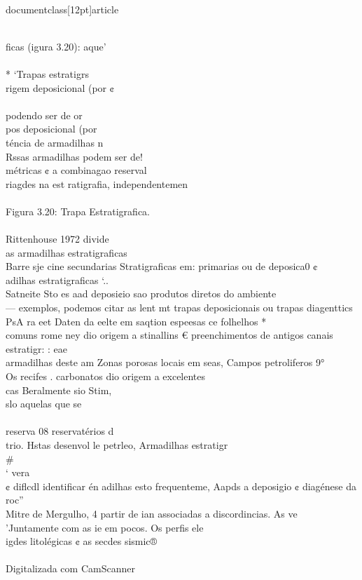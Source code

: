 \\documentclass[12pt]{article}
\begin{document}
\\{ficas (igura 3.20): aque’\\
\\
* ‘Trapas estratigrs\\
rigem deposicional (por ¢\\
\\
podendo ser de or\\
pos deposicional (por\\
téncia de armadilhas n\\
Rssas armadilhas podem ser de!\\
métricas ¢ a combinagao reserval\\
riagdes na est ratigrafia, independentemen\\
\\
Figura 3.20: Trapa Estratigrafica.\\
\\
Rittenhouse 1972 divide\\
as armadilhas estratigraficas\\
Barre sje cine secundarias Stratigraficas em: primarias ou de deposica0 ¢\\
adilhas estratigraficas ‘..\\
Satneite Sto es aad deposi¢io sao produtos diretos do ambiente\\
— exemplos, podemos citar as lent mt trapas deposicionais ou trapas diagenttics\\
PsA ra eet Daten da eelte em saqtion espeesas ce folhelhos *\\
comuns rome ney dio origem a stinallins € preenchimentos de antigos canais\\
estratigr: : eae\\
armadilhas deste am Zonas porosas locais em seas, Campos petroliferos 9°\\
Os recifes . carbonatos dio origem a excelentes\\
cas Beralmente sio Stim,\\
slo aquelas que se\\
\\
reserva 08 reservatérios d\\
trio. Hstas desenvol le petrleo, Armadilhas estratigr\\#\\
‘ vera\\
¢ diflcdl identificar én adilhas esto frequenteme, Aapds a deposigio ¢ diagénese da roc”\\
Mitre de Mergulho, 4 partir de ian associadas a discordincias. As ve\\
’Juntamente com as ie em pocos. Os perfis ele\\
igdes litolégicas ¢ as secdes sismic®\\
\\
Digitalizada com CamScanner\\

}
\end{document}
